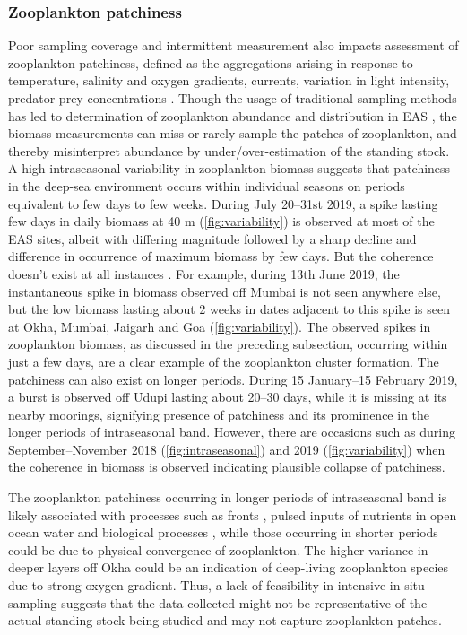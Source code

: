 \documentclass[authoryear,review,12pt]{elsarticle}
\begin{document}
    \subsubsection{Zooplankton patchiness}
    \label{sec:zooplanktonpatch}
    Poor sampling coverage and intermittent measurement also impacts assessment of zooplankton patchiness, defined as the aggregations arising in response to temperature, salinity and oxygen gradients, currents, variation in light intensity, predator-prey concentrations \citep{folt1999biological,raghukumar2003marine}. Though the usage of traditional sampling methods has led to determination of zooplankton abundance and distribution in EAS \citep{madhupratap1992zooplankton,madhupratap1996lack,khandagale2022seasonal}, the biomass measurements can miss or rarely sample the patches of zooplankton, and thereby misinterpret abundance by under/over-estimation of the standing stock. A high intraseasonal variability in zooplankton biomass suggests that patchiness in the deep-sea environment occurs within individual seasons on periods equivalent to few days to few weeks. During July 20--31st 2019, a spike lasting few days in daily biomass at 40 m (\cref{fig:variability}) is observed at most of the EAS sites, albeit with differing magnitude followed by a sharp decline and difference in occurrence of maximum biomass by few days. But the coherence doesn't exist at all instances . For example, during 13th June 2019, the instantaneous spike in biomass observed off Mumbai is not seen anywhere else, but the low biomass lasting about 2 weeks in dates adjacent to this spike is seen at  Okha, Mumbai, Jaigarh and Goa (\cref{fig:variability}). The observed spikes in zooplankton biomass, as discussed in the preceding subsection, occurring within just a few days, are a clear example of the zooplankton cluster formation. The patchiness can also exist on longer periods. During 15 January--15 February 2019, a burst is observed off Udupi lasting about 20--30 days, while it is missing at its nearby moorings, signifying presence of patchiness and its prominence in the longer periods of intraseasonal band. However, there are occasions such as during September--November 2018 (\cref{fig:intraseasonal}) and 2019 (\cref{fig:variability}) when the coherence in biomass is observed indicating plausible collapse of patchiness.
    
    The zooplankton patchiness occurring in longer periods of intraseasonal band is likely associated with processes such as fronts \citep{coyle2000seasonal,wade2001acoustic,hitchcock2002zooplankton}, pulsed inputs of nutrients in open ocean water \citep{anil2021short} and biological processes \citep{folt1999biological}, while those occurring in shorter periods could be due to physical convergence \citep{napp1996plankton} of zooplankton. The higher variance in deeper layers off Okha could be an indication of deep-living zooplankton species \citep{raghukumar2003marine} due to strong oxygen gradient. Thus, a lack of feasibility in intensive in-situ sampling suggests that the data collected might not be representative of the actual standing stock being studied \citep{smith1998seasonal} and may not capture zooplankton patches.
    
\end{document}
